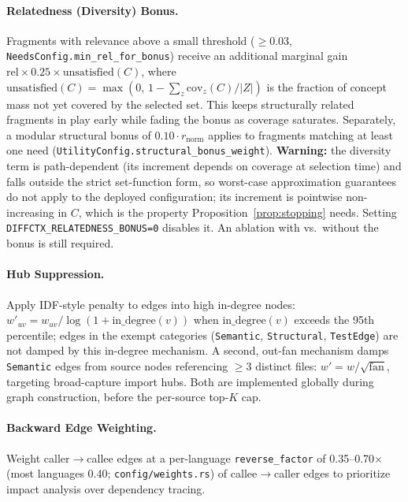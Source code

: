 \documentclass[11pt, a4paper]{article}
\begin{document}
\paragraph{Relatedness (Diversity) Bonus.} Fragments with relevance above a small threshold ($\geq 0.03$, \texttt{NeedsConfig.min\_rel\_for\_bonus}) receive an additional marginal gain $\text{rel} \times 0.25 \times \text{unsatisfied}(C)$, where $\text{unsatisfied}(C) = \max(0,\, 1 - \sum_z \mathrm{cov}_z(C)/|Z|)$ is the fraction of concept mass not yet covered by the selected set. This keeps structurally related fragments in play early while fading the bonus as coverage saturates. Separately, a modular structural bonus of $0.10 \cdot r_{\mathrm{norm}}$ applies to fragments matching at least one need (\texttt{UtilityConfig.structural\_bonus\_weight}). \textbf{Warning:} the diversity term is path-dependent (its increment depends on coverage at selection time) and falls outside the strict set-function form, so worst-case approximation guarantees do not apply to the deployed configuration; its increment is pointwise non-increasing in $C$, which is the property Proposition~\ref{prop:stopping} needs. Setting \texttt{DIFFCTX\_RELATEDNESS\_BONUS=0} disables it. An ablation with vs.\ without the bonus is still required.

\paragraph{Hub Suppression.} Apply IDF-style penalty to edges into high in-degree nodes: $w'_{uv} = w_{uv} / \log(1 + \text{in\_degree}(v))$ when $\text{in\_degree}(v)$ exceeds the 95th percentile; edges in the exempt categories (\texttt{Semantic}, \texttt{Structural}, \texttt{TestEdge}) are not damped by this in-degree mechanism. A second, out-fan mechanism damps \texttt{Semantic} edges from source nodes referencing $\geq 3$ distinct files: $w' = w / \sqrt{\mathrm{fan}}$, targeting broad-capture import hubs. Both are implemented globally during graph construction, before the per-source top-$K$ cap.

\paragraph{Backward Edge Weighting.} Weight caller$\to$callee edges at a per-language \texttt{reverse\_factor} of 0.35--0.70$\times$ (most languages 0.40; \texttt{config/weights.rs}) of callee$\to$caller edges to prioritize impact analysis over dependency tracing.
\end{document}
